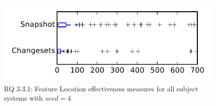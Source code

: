 
\begin{figure}
\centering
\includegraphics[height=0.4\textheight]{figures/flt_seed/rq1_tiny_4}
\caption{RQ 3.3.1: Feature Location effectiveness measures for all subject systems with $seed=4$}
\label{fig:flt_seed:rq1:tiny}
\end{figure}
